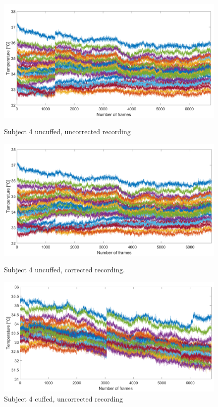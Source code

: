 \begin{figure}[htbp]
	\begin{minipage}[b]{0.45\linewidth}
		\centering
		\includegraphics[width=\linewidth]{figures/Recordings/Sub4_uncuffed_uncorr}
		\caption{Subject 4 uncuffed, uncorrected recording}
	
	\end{minipage}
	\hspace{0.2cm}
	\begin{minipage}[b]{0.45\linewidth}
		\centering
		\includegraphics[width=\linewidth]{figures/Recordings/Sub4_uncuffed_corr}
		\caption{Subject 4 uncuffed, corrected recording.}
	
	\end{minipage}
	\hspace{0.2cm}
	\begin{minipage}[b]{0.45\linewidth}
		\centering
		\includegraphics[width=\linewidth]{figures/Recordings/Sub4_cuffed_uncorr}
		\caption{Subject 4 cuffed, uncorrected recording}
	

\end{minipage}
\end{figure}
